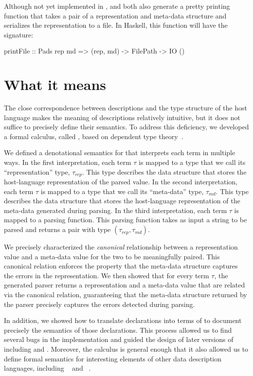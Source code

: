 \documentclass{sig-alternate}
\begin{document}
Although not yet implemented in \padshaskell{}, \padsc{} and
\padsml{} both also generate a pretty printing function that takes a
pair of a representation and meta-data structure and serializes the
representation to a file.  In Haskell, this function will have the
signature:
\begin{code}
printFile :: Pads rep md => 
             (rep, md) -> FilePath -> IO ()
\end{code}



\section{What it means}
\label{sec:formal}
The close correspondence between \pads{} descriptions and the type
structure of the host language makes the meaning of \pads{}
descriptions relatively intuitive, but it does not suffice to
precisely define their semantics.  To address this deficiency, we
developed a formal calculus, called \ddca{}, based on dependent type
theory~\cite{Fisher+:ddca}.  

We defined a denotational semantics for \ddca{} that interprets
each term in multiple ways.  In the first interpretation, each \ddca{}
term $\tau$ is mapped to a type that we call its ``representation''
type, $\tau_{rep}$.  This type describes the data structure that stores the
host-language representation of the parsed value.  In the second
interpretation, each \ddca{} term $\tau$ is mapped to a type that we
call its ``meta-data'' type, $\tau_{md}$.  This type describes the data
structure that stores the host-language representation of the
meta-data generated during parsing.  In the third interpretation, each
\ddca{} term $\tau$ is mapped to a parsing function.  This parsing
function takes as input a string to be parsed and returns a pair with
type $(\tau_{rep}, \tau_{md})$.

We precisely characterized the \textit{canonical} relationship between a
representation value and a meta-data value for the two to be
meaningfully paired.  This canonical relation enforces the property
that the meta-data structure captures the errors in the
representation.  We then showed that for every \ddca{} term $\tau$,
the generated parser returns a representation and a meta-data value
that are related via the canonical relation, guaranteeing that the
meta-data structure returned by the parser precisely captures the
errors detected during parsing. 

In addition, we showed how to translate \pads{} declarations into terms of
\ddca{} to document precisely the semantics of those declarations.
This process allowed us to find several bugs in the \padsc{}
implementation and guided the design of later versions of \pads{}
including \padsml{} and \padshaskell{}.  Moreover,
the \ddca{} calculus is general enough that it also allowed us to
define formal semantics for interesting elements of other data description languages,
including \packettypes{}~\cite{sigcomm00} and
\datascript{}~\cite{gpce02}. 
\end{document}
